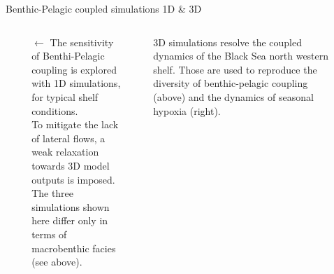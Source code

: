 \documentclass[final]{beamer}
\begin{document}
\begin{frame}[fragile]
\begin{columns}[T]
\begin{column}{.64\textwidth}
	\begin{block}{Benthic-Pelagic coupled simulations 1D \& 3D}
	   \vskip -12mm
	  \begin{columns}[T]
	    
	    \begin{column}{.30\textwidth}
	      \begin{figure}
	      \end{figure}
	    \end{column}
	    
	    \begin{column}{.18\textwidth}
	      \justify
	      \alert{\textbf{$\leftarrow$}} 
	      The sensitivity of Benthi-Pelagic coupling is explored with  \alert{1D simulations}, for typical shelf conditions.  \\
	      To mitigate the lack of lateral flows, a weak relaxation towards 3D model outputs is imposed. \\
	      The three simulations shown here differ only in terms of macrobenthic facies (see above). 
	    \end{column}

	    \begin{column}{.02\textwidth}
	    
	    \end{column}
	    
	    \begin{column}{.25\textwidth}
	      \begin{figure}
	      \end{figure}
	   \alert{ 3D simulations} resolve the coupled dynamics of the Black Sea north western shelf. 
	    Those are used to reproduce the diversity of benthic-pelagic coupling (above) and the dynamics of seasonal hypoxia (right).
	    \end{column}
	    
	    \begin{column}{.30\textwidth}
	      \begin{figure}
	      \end{figure}
	    \end{column}
	    
	  \end{columns}
	  	  \vskip -5mm
	\end{block}
	
      \end{column}
    \end{columns}
    
    
    
\end{frame}
\end{document}
